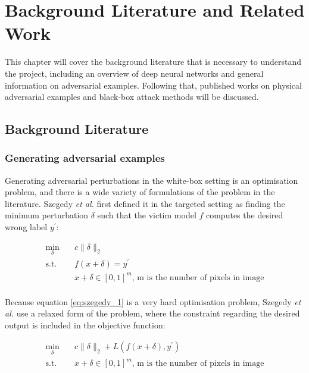 \chapter{Background Literature and Related Work}
	\label{chap:background}
	
This chapter will cover the background literature that is necessary to understand the project, including an overview of deep neural networks and general information on adversarial examples. Following that, published works on physical adversarial examples and black-box attack methods will be discussed. 

\section{Background Literature}

\subsection{Generating adversarial examples}

Generating adversarial perturbations in the white-box setting is an optimisation problem, and there is a wide variety of formulations of the problem in the literature. Szegedy \textit{et al.} \cite{szegedy2014intriguing} first defined it in the targeted setting as finding the minimum perturbation $\delta$ such that the victim model $f$ computes the desired wrong label $y^\prime$:

\begin{equation}
\label{eq:szegedy_1}
\begin{aligned}
\min_{\delta} \quad & c\|\delta\|_2\\
\textrm{s.t.} \quad & f(x + \delta) = y^\prime\\
  &x + \delta \in [0,1]^m \textrm{, m is the number of pixels in image}   \\
\end{aligned}
\end{equation}

Because equation \ref{eq:szegedy_1} is a very hard optimisation problem, Szegedy \textit{et al.} \cite{szegedy2014intriguing} use a relaxed form of the problem, where the constraint regarding the desired output is included in the objective function:

\begin{equation}
\label{eq:szegedy_2}
\begin{aligned}
\min_{\delta} \quad & c\|\delta\|_2 + L(f(x + \delta), y^\prime)\\
\textrm{s.t.} \quad& x + \delta \in [0,1]^m \textrm{, m is the number of pixels in image}   \\
\end{aligned}
\end{equation}

